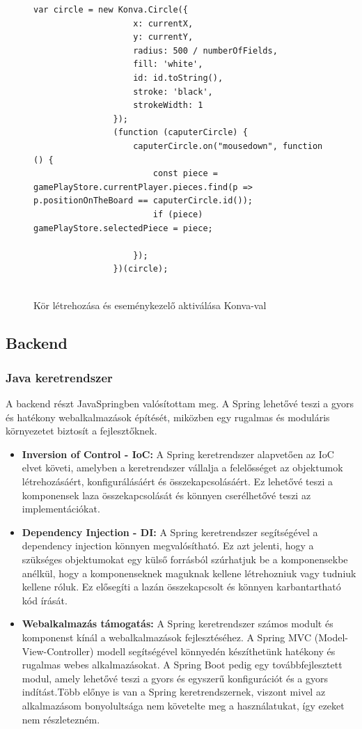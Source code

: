 \documentclass[a4paper,twoside]{article}
\begin{document}
\begin{figure}
	\caption{Kör létrehozása és eseménykezelő aktiválása Konva-val}
	\begin{adjustwidth}{0cm}{10cm}
		\begin{minipage}{\textwidth}
			\begin{lstlisting}[style=javascriptStyle]
				var circle = new Konva.Circle({
					x: currentX,
					y: currentY,
					radius: 500 / numberOfFields,
					fill: 'white',
					id: id.toString(),
					stroke: 'black',
					strokeWidth: 1
				});
				(function (caputerCircle) {
					caputerCircle.on("mousedown", function () {
						const piece = gamePlayStore.currentPlayer.pieces.find(p => p.positionOnTheBoard == caputerCircle.id());
						if (piece) gamePlayStore.selectedPiece = piece;
						
					});
				})(circle);
				
			\end{lstlisting}
		\end{minipage}
	\end{adjustwidth}
	\label{konva}
\end{figure} 

\subsection{Backend}

\subsubsection{Java keretrendszer}
A backend részt JavaSpringben\cite{javaspring} valósítottam meg. A Spring lehetővé teszi a gyors és hatékony
webalkalmazások építését, miközben egy rugalmas és moduláris környezetet biztosít a
fejlesztőknek.
\begin{itemize}
	\item  \textbf{Inversion of Control - IoC:} A Spring keretrendszer alapvetően az IoC elvet követi,
	amelyben a keretrendszer vállalja a felelősséget az objektumok létrehozásáért,
	konfigurálásáért és összekapcsolásáért. Ez lehetővé teszi a komponensek laza
	összekapcsolását és könnyen cserélhetővé teszi az implementációkat.
	\item \textbf{Dependency Injection - DI:} A Spring keretrendszer segítségével a dependency
	injection könnyen megvalósítható. Ez azt jelenti, hogy a szükséges objektumokat egy
	külső forrásból szúrhatjuk be a komponensekbe anélkül, hogy a komponenseknek
	maguknak kellene létrehozniuk vagy tudniuk kellene róluk. Ez elősegíti a lazán
	összekapcsolt és könnyen karbantartható kód írását.
	\item \textbf{Webalkalmazás támogatás:} A Spring keretrendszer számos modult és komponenst
	kínál a webalkalmazások fejlesztéséhez. A Spring MVC (Model-View-Controller)
	modell segítségével könnyedén készíthetünk hatékony és rugalmas webes
	alkalmazásokat. A Spring Boot pedig egy továbbfejlesztett modul, amely lehetővé
	teszi a gyors és egyszerű konfigurációt és a gyors indítást.Több előnye is van a Spring
	keretrendszernek, viszont mivel az alkalmazásom bonyolultsága nem követelte meg a
	használatukat, így ezeket nem részletezném.
\end{itemize}
\end{document}

